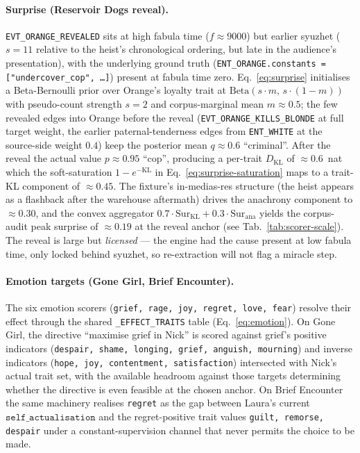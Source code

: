 \documentclass[11pt]{article}
\begin{document}
\paragraph{Surprise (Reservoir Dogs reveal).}
\texttt{EVT\_ORANGE\_REVEALED} sits at high fabula time
($f \approx 9000$) but earlier syuzhet ($s = 11$ relative to
the heist's chronological ordering, but late in the audience's
presentation), with the underlying ground truth
(\texttt{ENT\_ORANGE.constants = ["undercover\_cop", \ldots]})
present at fabula time zero. Eq.~\ref{eq:surprise} initialises a
Beta-Bernoulli prior over Orange's loyalty trait at
$\mathrm{Beta}(s\!\cdot\!m,\,s\!\cdot\!(1{-}m))$ with
pseudo-count strength $s = 2$ and corpus-marginal mean $m \approx 0.5$;
the few revealed edges into Orange before the reveal
(\texttt{EVT\_ORANGE\_KILLS\_BLONDE} at full target weight, the
earlier paternal-tenderness edges from \texttt{ENT\_WHITE} at
the source-side weight $0.4$) keep the posterior mean
$q \approx 0.6$ ``criminal''. After the reveal the actual value
$p \approx 0.95$ ``cop'', producing a per-trait
$D_\mathrm{KL}$ of $\approx 0.6$~nat which the soft-saturation
$1 - e^{-\mathrm{KL}}$ in Eq.~\ref{eq:surprise-saturation} maps
to a trait-KL component of $\approx 0.45$. The fixture's
in-medias-res structure (the heist appears as a flashback after
the warehouse aftermath) drives the anachrony component to
$\approx 0.30$, and the convex aggregator $0.7\!\cdot\!\mathrm{Sur}_\mathrm{KL}
+ 0.3\!\cdot\!\mathrm{Sur}_\mathrm{ana}$ yields the corpus-audit
peak surprise of $\approx 0.19$ at the reveal anchor (see
Tab.~\ref{tab:scorer-scale}). The reveal is large but
\emph{licensed} --- the engine had the cause present at low
fabula time, only locked behind syuzhet, so re-extraction will
not flag a miracle step.

\paragraph{Emotion targets (Gone Girl, Brief Encounter).} The six
emotion scorers (\texttt{grief, rage, joy, regret, love, fear})
resolve their effect through the shared
\texttt{\_EFFECT\_TRAITS} table
(Eq.~\ref{eq:emotion}). On Gone Girl, the directive ``maximise
grief in Nick'' is scored against grief's positive indicators
(\texttt{despair, shame, longing, grief, anguish, mourning})
and inverse indicators (\texttt{hope, joy, contentment,
satisfaction}) intersected with Nick's actual trait set, with
the available headroom against those targets determining whether
the directive is even feasible at the chosen anchor. On Brief
Encounter the same machinery realises \texttt{regret} as the gap
between Laura's current $\texttt{self\_actualisation}$ and the
regret-positive trait values \texttt{guilt, remorse, despair}
under a constant-supervision channel that never permits the
choice to be made.
\end{document}
